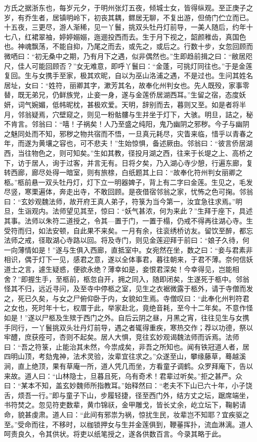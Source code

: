 \documentclass[a4paper,12pt,UTF8,twoside]{ctexbook}
\begin{document}
方氏之据浙东也，每岁元夕，于明州张灯五夜，倾城士女，皆得纵观。至正庚子之岁，有乔生者，居镇明岭下，初丧其耦，鳏居无聊，不复出游，但倚门伫立而已。十五夜，三更尽，游人渐稀，见一丫鬟，挑双头牡丹灯前导，一美人随后，约年十七八，红裙翠袖，婷婷嫋嫋，迤逦投西而去。生于月下视之，韶颜稚齿，真国色也。神魂飘荡，不能自抑，乃尾之而去，或先之，或后之。行数十步，女忽回顾而微哂曰：“初无桑中之期，乃有月下之遇，似非偶然也。”生即趋前揖之曰：“敝居咫尺，佳人可能回顾否？”女无难意，即呼丫鬟曰：“金蓬，可挑灯同往也。”于是金莲复回。生与女携手至家，极其欢昵，自以为巫山洛浦之遇，不是过也。生问其姓名居址，女曰：“姓符，丽卿其字，漱芳其名，故奉化州判女也。先人既殁，家事零替，既无弟兄，仍鲜族党，止妾一身，遂与金莲侨居湖西耳。”生留之宿，态度妖妍，词气婉媚，低帏昵枕，甚极欢爱。天明，辞别而去，暮则又至。如是者将半月，邻翁疑焉，穴壁窥之，则见一粉骷髏与生并坐于灯下，大骇。明旦，詰之，秘不肯言。邻翁曰：“嘻！子祸矣！人乃至盛之纯阳，鬼乃幽阴之邪秽。今子与幽阴之魅同处而不知，邪秽之物共宿而不悟，一旦真元耗尽，灾眚来临，惜乎以青春之年，而遂为黄壤之容也，可不悲夫！”生始惊惧，备述厥由。邻翁曰：“彼言侨居湖西，当往物色之，则可知矣。”生如其教，径投月湖之西，往来于长堤之上、高桥之下，访于居人，询于过客，并言无有。日将夕矣，乃入湖心寺少憩，行遍东廊，复转西廊，廊尽处得一暗室，则有旅榇，白纸题其上曰：“故奉化符州判女丽卿之柩。”柩前悬一双头牡丹灯，灯下立一明器婢子，背上有二字曰金莲。生见之，毛发尽竖，寒栗遍体，奔走出寺，不敢回顾。是夜借宿邻翁之家，忧怖之色可掬。邻翁曰：“玄妙观魏法师，故开府王真人弟子，符箓为当今第一，汝宜急往求焉。”明旦，生诣观内。法师望见其至，惊曰：“妖气甚浓，何为来此？”生拜于座下，具述其事。法师以朱符二道授之，令其—置于门，一置于榻，仍戒不得再往湖心寺。生受符而归，如法安顿，自此果不来矣。一月有余，往衮绣桥访友。留饮至醉，都忘法师之戒，径取湖心寺路以回。将及寺门，则见金莲迎拜于前曰：“娘子久待，何一向薄情如是！”遂与生俱入西廊，直抵室中。女宛然在坐，数之曰：“妾与君素非相识，偶于灯下一见，感君之意，遂以全体事君，暮往朝来，于君不薄。奈何信妖道士之言，遽生疑惑，便欲永绝？薄幸如是，妾恨君深矣！今幸得见，岂能相舍？”即握生手，至柩前，柩忽自开，拥之同入，随即闭矣，生遂死于柩中。邻翁怪其不归，远近寻问，及至寺中停柩之室，见生之衣裾微露于柩外，请于寺僧而发之，死已久矣，与女之尸俯仰卧于内，女貌如生焉。寺僧叹曰：“此奉化州判符君之女也，死时年十七，权厝于此，举家赴北，竟绝音耗，至今十二年矣。不意作怪如是！”遂以尸柩及生殡于西门之外。自后云阴之昼，月黑之宵，往往见生与女携手同行，一丫鬟挑双头壮丹灯前导，遇之者辄得重疾，寒热交作；荐以功德，祭以牢醴，庶获痊可，杏则不起矣。居人大惧，竞往玄妙观谒魏法师而诉焉。法师曰：“吾之符箓，止能治其未然，今祟成矣，非吾之所知也。闻有铁冠道人者，居四明山顶，考劾鬼神，法术灵验，汝辈宜往求之。”众遂至山，攀缘藤草，蓦越溪涧，直上绝顶，果有草庵一所，道人凭几而坐，方看童子调鹤。众罗拜庵下，告以来故。道人曰：“山林隐士，旦暮且死，乌有奇术！君辈过听矣。”拒之甚严。众曰：“某本不知，盖玄妙魏师所指教耳。”始释然曰：“老夫不下山已六十年，小子饶舌，烦吾一行。”即与童子下山，步履轻捷，径至西门外，结方丈之坛，踞席端坐，书符焚之。忽见符吏数辈，黄巾锦祆，金甲雕戈，皆长丈余，屹立坛下，鞠躬请命，貌甚虔肃。道人曰：“此间有邪祟为祸，惊扰生民，妆辈岂不知耶？宜疾驱之至。”受命而往，不移时，以枷锁押女与生并金莲俱到，鞭菙挥扑，流血淋漓。道人呵责良久，令其供状。将吏以纸笔授之，遂各供数百言。今录其略于此。
\end{document}
